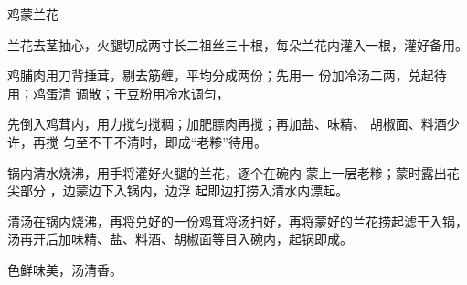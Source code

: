 \begin{recipe}{鸡蒙兰花}

\ingredients


\preparation

\step 兰花去茎抽心，火腿切成两寸长二祖丝三十根，每朵兰花内灌入一根，灌好备用。

鸡脯肉用刀背捶茸，剔去筋缠，平均分成两份；先用一 份加冷汤二两，兑起待用；鸡蛋清
调散；干豆粉用冷水调匀，

先倒入鸡茸内，用力搅匀搅稠；加肥膘肉再搅；再加盐、味精、 胡椒面、料酒少许，再搅
匀至不干不清时，即成“老糁”待用。

锅内清水烧沸，用手将灌好火腿的兰花，逐个在碗内 蒙上一层老糁；蒙时露出花尖部分
，边蒙边下入锅内，边浮 起即边打捞入清水内漂起。

\step 清汤在锅内烧沸，再将兑好的一份鸡茸将汤扫好，再将蒙好的兰花捞起滤干入锅，
汤再开后加味精、盐、料酒、胡椒面等目入碗内，起锅即成。

\features

色鲜味美，汤清香。

\end{recipe}

